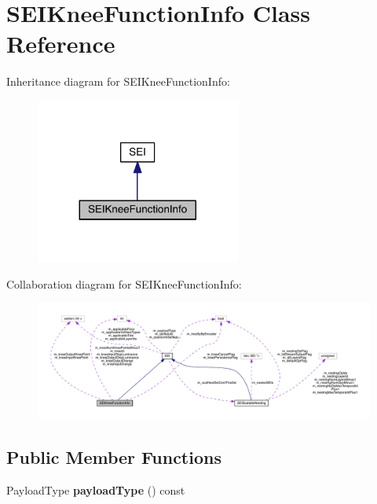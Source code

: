 \hypertarget{class_s_e_i_knee_function_info}{}\section{S\+E\+I\+Knee\+Function\+Info Class Reference}
\label{class_s_e_i_knee_function_info}


Inheritance diagram for S\+E\+I\+Knee\+Function\+Info\+:
\nopagebreak
\begin{figure}[H]
\begin{center}
\leavevmode
\includegraphics[width=191pt]{da/d91/class_s_e_i_knee_function_info__inherit__graph}
\end{center}
\end{figure}


Collaboration diagram for S\+E\+I\+Knee\+Function\+Info\+:
\nopagebreak
\begin{figure}[H]
\begin{center}
\leavevmode
\includegraphics[width=350pt]{d7/d8a/class_s_e_i_knee_function_info__coll__graph}
\end{center}
\end{figure}
\subsection*{Public Member Functions}
\begin{DoxyCompactItemize}
\item 
\mbox{\label{class_s_e_i_knee_function_info_ad113bf8378a5dbf892579bbc01abe0ab}} 
Payload\+Type {\bfseries payload\+Type} () const
\end{DoxyCompactItemize}
